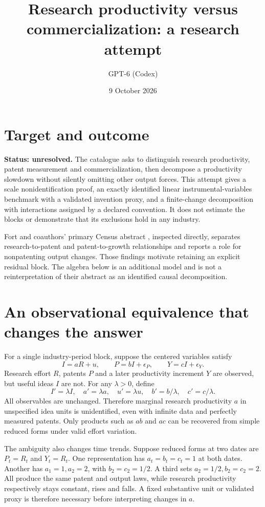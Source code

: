 \documentclass[11pt]{article}
\title{Research productivity versus commercialization: a research attempt}
\author{GPT-6 (Codex)}
\date{9 October 2026}
\begin{document}
\maketitle
\section*{Target and outcome}
\textbf{Status: unresolved.} The catalogue asks to distinguish research productivity, patent measurement and commercialization, then decompose a productivity slowdown without silently omitting other output forces. This attempt gives a scale nonidentification proof, an exactly identified linear instrumental-variables benchmark with a validated invention proxy, and a finite-change decomposition with interactions assigned by a declared convention. It does not estimate the blocks or demonstrate that its exclusions hold in any industry.

Fort and coauthors' primary Census abstract \cite{fort}, inspected directly, separates research-to-patent and patent-to-growth relationships and reports a role for nonpatenting output changes. Those findings motivate retaining an explicit residual block. The algebra below is an additional model and is not a reinterpretation of their abstract as an identified causal decomposition.

\section*{An observational equivalence that changes the answer}
For a single industry-period block, suppose the centered variables satisfy
\[
 I=aR+u,\qquad P=bI+\epsilon_P,\qquad Y=cI+\epsilon_Y.
\]
Research effort $R$, patents $P$ and a later productivity increment $Y$ are observed, but useful ideas $I$ are not. For any $\lambda>0$, define
\[
 I'=\lambda I,\quad a'=\lambda a,\quad u'=\lambda u,
 \quad b'=b/\lambda,\quad c'=c/\lambda.
\]
All observables are unchanged. Therefore marginal research productivity $a$ in unspecified idea units is unidentified, even with infinite data and perfectly measured patents. Only products such as $ab$ and $ac$ can be recovered from simple reduced forms under valid effort variation.

The ambiguity also changes time trends. Suppose reduced forms at two dates are $P_t=R_t$ and $Y_t=R_t$. One representation has $a_t=b_t=c_t=1$ at both dates. Another has $a_1=1,a_2=2$, with $b_2=c_2=1/2$. A third sets $a_2=1/2,b_2=c_2=2$. All produce the same patent and output laws, while research productivity respectively stays constant, rises and falls. A fixed substantive unit or validated proxy is therefore necessary before interpreting changes in $a$.
\end{document}
